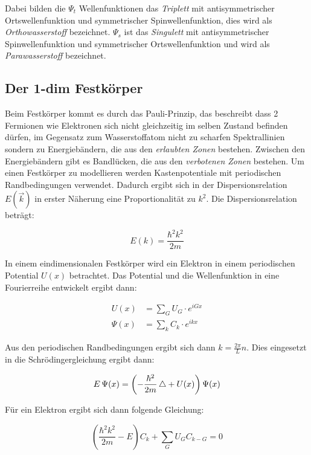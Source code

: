 Dabei bilden die $\Psi_t$ Wellenfunktionen das \textit{Triplett} mit antisymmetrischer Ortswellenfunktion und symmetrischer Spinwellenfunktion, dies wird als \textit{Orthowasserstoff} bezeichnet. $\Psi_s$ ist das \textit{Singulett} mit antisymmetrischer Spinwellenfunktion und symmetrischer Ortswellenfunktion und wird als \textit{Parawasserstoff} bezeichnet. 

\subsection{Der 1-dim Festkörper}
\label{sec:festkoerper}

Beim Festkörper kommt es durch das Pauli-Prinzip, das beschreibt dass 2 Fermionen wie Elektronen sich nicht gleichzeitig im selben Zustand befinden dürfen, im Gegensatz zum Wasserstoffatom nicht zu scharfen Spektrallinien sondern zu Energiebändern, die aus den \textit{erlaubten Zonen} bestehen. Zwischen den Energiebändern gibt es Bandlücken, die aus den \textit{verbotenen Zonen} bestehen. Um einen Festkörper zu modellieren werden Kastenpotentiale mit periodischen Randbedingungen verwendet. Dadurch ergibt sich in der Dispersionsrelation $E(\vec{k})$ in erster Näherung eine Proportionalität zu $k^2$. Die Dispersionsrelation beträgt:

\begin{equation}
    E(k) = \frac{\hbar^2 k^2}{2 m}
    \label{eqn:disp}
\end{equation}

In einem eindimensionalen Festkörper wird ein Elektron in einem periodischen Potential $U(x)$ betrachtet. Das Potential und die Wellenfunktion in eine Fourierreihe entwickelt ergibt dann:

\begin{align}
    U (x) &= \sum_G U_G \cdot e^{iGx} \\
    \Psi (x) &= \sum_k C_k \cdot e^{ikx}
\end{align}

Aus den periodischen Randbedingungen ergibt sich dann $k = \frac{2 \pi}{L} n$. Dies eingesetzt in die Schrödingergleichung ergibt dann:

\begin{equation}
    E \, \Psi (x) = \left( - \frac{\hbar^2}{2m} \mathop{}\!\mathbin\bigtriangleup + U (x) \right) \Psi (x)
    \label{eqn:fest_schroed}
\end{equation}

Für ein Elektron ergibt sich dann folgende Gleichung:

\begin{equation}
    \left( \frac{\hbar^2 k^2}{2m} - E \right) C_k + \sum_G U_G C_{k-G} = 0
    \label{eqn:fest_el}
\end{equation}

